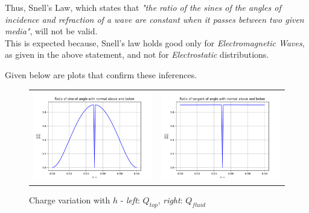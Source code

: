 \documentclass[11pt, a4paper, twoside]{report}
\begin{document}
            Thus, Snell's Law, which states that \textit{"the ratio of the sines of the angles of incidence and refraction of a wave are constant when it passes between two given media"}\cite{SNELL}, will not be valid.\\

            This is expected because, Snell's law holds good only for \textit{Electromagnetic Waves}, as given in the above statement, and not for \textit{Electrostatic} distributions.

            Given below are plots that confirm these inferences.
            \begin{figure}[H]
                \centering
                \setlength\tabcolsep{2pt}
                \begin{tabular}{cc}
                    \includegraphics[scale=0.5]{Fig6.png} &
                    \includegraphics[scale=0.5]{Fig7.png}\\
                \end{tabular}
                \caption{Charge variation with $h$ - \textit{left}: $Q_{top}$, \textit{right}: $Q_{fluid}$}
            \end{figure}
\end{document}
